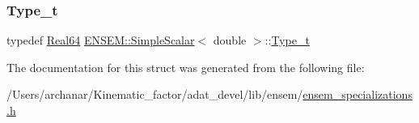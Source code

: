 \mbox{\label{structENSEM_1_1SimpleScalar_3_01double_01_4_a1f42edea984ac3b783290e5043381603}} 
\subsubsection{\texorpdfstring{Type\_t}{Type\_t}\hspace{0.1cm}{\footnotesize\ttfamily [2/2]}}
{\footnotesize\ttfamily typedef \mbox{\hyperlink{group__defs_gaae0bff35c031375b1ffeb693402496c8}{Real64}} \mbox{\hyperlink{structENSEM_1_1SimpleScalar}{E\+N\+S\+E\+M\+::\+Simple\+Scalar}}$<$ double $>$\+::\mbox{\hyperlink{structENSEM_1_1SimpleScalar_3_01double_01_4_a1f42edea984ac3b783290e5043381603}{Type\+\_\+t}}}



The documentation for this struct was generated from the following file\+:\begin{DoxyCompactItemize}
\item 
/\+Users/archanar/\+Kinematic\+\_\+factor/adat\+\_\+devel/lib/ensem/\mbox{\hyperlink{lib_2ensem_2ensem__specializations_8h}{ensem\+\_\+specializations.\+h}}\end{DoxyCompactItemize}
